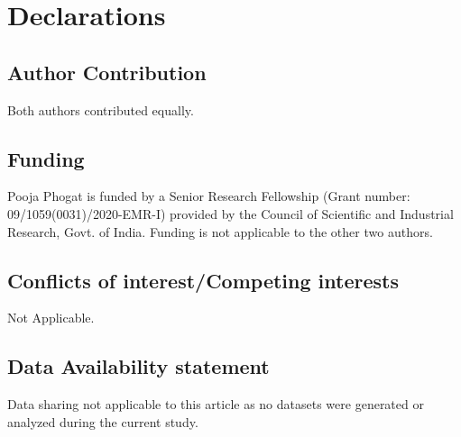 \documentclass[12pt]{article}
\begin{document}
 \section{Declarations}
 \subsection{Author Contribution} Both authors contributed equally.
 \subsection{Funding} Pooja Phogat is funded by a Senior Research Fellowship (Grant number: 09/1059(0031)/2020-EMR-I) provided by the Council of Scientific and Industrial Research, Govt. of India. Funding is not applicable to the other two authors.
 \subsection{Conflicts of interest/Competing interests}
 Not Applicable.
 \subsection{Data Availability statement} Data sharing not applicable to this article as no datasets were generated or analyzed during the current study.
\end{document}
